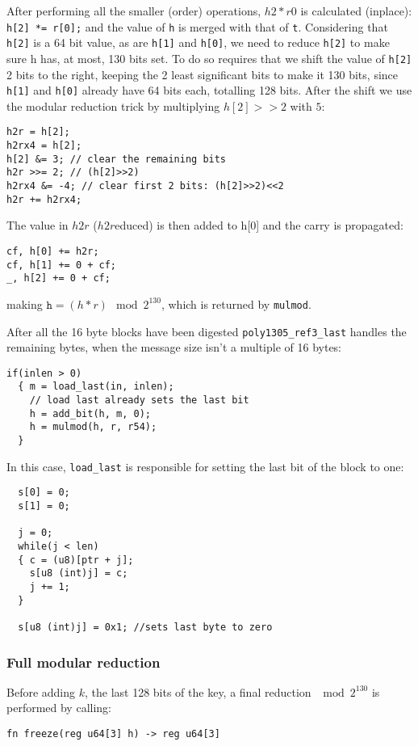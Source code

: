 \documentclass{article}
\begin{document}
After performing all the smaller (order) operations, $h2*r0$ is calculated (inplace): \texttt{h[2] *= r[0];} and the value of \texttt{h} is merged with that
of \texttt{t}. Considering that \texttt{h[2]} is a 64 bit value, as are \texttt{h[1]} and \texttt{h[0]}, we need to reduce \texttt{h[2]} to make sure h has, at 
most, 130 bits set. To do so requires that we shift the value of \texttt{h[2]} 2 bits to the right, keeping the 2 least significant bits to make it 130 bits, 
since \texttt{h[1]} and \texttt{h[0]} already have 64 bits each, totalling 128 bits. After the shift we use the modular reduction trick by multiplying $h[2]>>2$ 
with $5$:
\begin{Verbatim}
h2r = h[2];
h2rx4 = h[2];
h[2] &= 3; // clear the remaining bits
h2r >>= 2; // (h[2]>>2)
h2rx4 &= -4; // clear first 2 bits: (h[2]>>2)<<2
h2r += h2rx4;
\end{Verbatim}

The value in $h2r$ ($h2r$educed) is then added to h[0] and the carry is propagated:

\begin{Verbatim}
cf, h[0] += h2r;
cf, h[1] += 0 + cf;
_, h[2] += 0 + cf;
\end{Verbatim}

making $\texttt{h} = (h*r)\mod{2^{130}}$, which is returned by \texttt{mulmod}.

After all the 16 byte blocks have been digested \texttt{poly1305\_ref3\_last} handles the remaining bytes, when the message size isn't a multiple of 16 bytes:
\begin{Verbatim}
if(inlen > 0)
  { m = load_last(in, inlen);
    // load last already sets the last bit
    h = add_bit(h, m, 0);
    h = mulmod(h, r, r54);
  }
\end{Verbatim}
In this case, \texttt{load\_last} is responsible for setting the last bit of the block to one:
\begin{Verbatim}
  s[0] = 0;
  s[1] = 0;

  j = 0;
  while(j < len)
  { c = (u8)[ptr + j];
    s[u8 (int)j] = c;
    j += 1;
  }

  s[u8 (int)j] = 0x1; //sets last byte to zero
\end{Verbatim}

\subsubsection{Full modular reduction}
Before adding $k$, the last 128 bits of the key, a final reduction $\mod 2^{130}$ is performed by calling:
\begin{Verbatim}
fn freeze(reg u64[3] h) -> reg u64[3]
\end{Verbatim}
\end{document}
